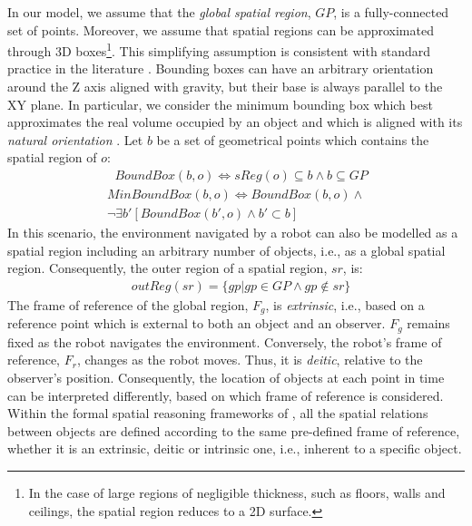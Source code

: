 \documentclass{article}
\begin{document}
In our model, we assume that the \textit{global spatial region}, $GP$, is a fully-connected set of points.
Moreover, we assume that spatial regions can be approximated through 3D boxes\footnote{\noindent In the case of large regions of negligible thickness, such as floors, walls and ceilings, the spatial region reduces to a 2D surface.}. This simplifying assumption is consistent with standard practice in the literature \cite{deeken_grounding_2018,borrmann_query_2010}. Bounding boxes can have an arbitrary orientation around the Z axis aligned with gravity, but their base is always parallel to the XY plane. In particular, we consider the minimum bounding box which best approximates the real volume occupied by an object and which is aligned with its \textit{natural orientation} \cite{chiatti_towards_2020}. Let $b$ be a set of geometrical points which contains the spatial region of $o$:
\begin{align} 
& \textit{BoundBox}(b,o) \Leftrightarrow    \textit{sReg}(o) \subseteq b \wedge  
   b \subseteq GP 
\end{align}
\begin{multline}
    \textit{MinBoundBox}(b,o)  \Leftrightarrow \textit{BoundBox}(b,o) \wedge 
   \\ 
    \neg \exists b'[\textit{BoundBox}(b',o) \wedge b' \subset b]
\end{multline}
In this scenario, the environment navigated by a robot can also be modelled as a spatial region including an arbitrary number of objects, i.e., as a global spatial region. Consequently, the outer region of a spatial region, $sr$, is:
\begin{align}
&   \textit{outReg}(sr) = \{gp|gp \in GP \wedge gp \notin sr \}
\end{align}
The frame of reference of the global region, $F_g$, is \textit{extrinsic}, i.e., based on a reference point which is external to both an object and an observer. $F_g$ remains fixed as the robot navigates the environment. Conversely, the robot's frame of reference, $F_r$, changes as the robot moves. Thus, it is \textit{deitic}, relative to the observer's position. Consequently, the location of objects at each point in time can be interpreted differently, based on which frame of reference is considered. Within the formal spatial reasoning frameworks of \cite{borrmann_query_2010,deeken_grounding_2018}, all the spatial relations between objects are defined according to the same pre-defined frame of reference, whether it is an extrinsic, deitic or intrinsic one, i.e., inherent to a specific object. 
\end{document}
